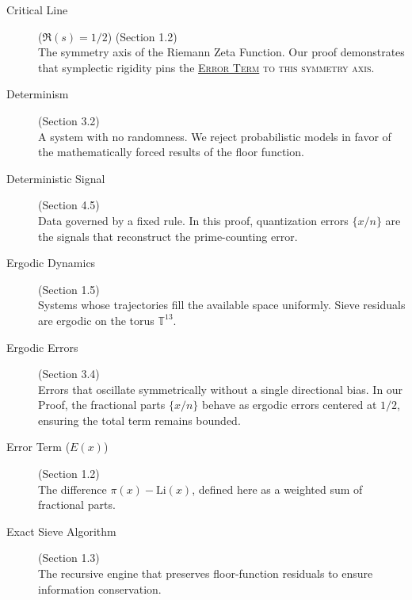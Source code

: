 \documentclass[sn-mathphys-num, pdflatex]{sn-jnl}
\newcommand{\gterm}[2]{\begingroup\normalfont\scshape\hyperlink{#1}{#2}\endgroup}
\begin{document}
\begin{description}
    \item[Critical Line] \hypertarget{critical_line}{}\label{gloss:criticalline} ($\Re(s) = 1/2$) (Section 1.2) \hfill \\
    The symmetry axis of the Riemann Zeta Function. Our proof demonstrates that symplectic rigidity pins the \gterm{error_term}{Error Term} to this symmetry axis.

    \item[Determinism] \hypertarget{deterministic}{}\label{gloss:determinism} (Section 3.2) \hfill \\
    A system with no randomness. We reject probabilistic models in favor of the mathematically forced results of the floor function.

    \item[Deterministic Signal] \hypertarget{deterministic_signal}{}\label{gloss:detsignal} (Section 4.5) \hfill \\
    Data governed by a fixed rule. In this proof, quantization errors $\{x/n\}$ are the signals that reconstruct the prime-counting error.

    \item[Ergodic Dynamics] \hypertarget{ergodic}{}\label{gloss:ergodicdynamics} (Section 1.5) \hfill \\
    Systems whose trajectories fill the available space uniformly. Sieve residuals are ergodic on the torus $\mathbb{T}^{13}$.

    \item[Ergodic Errors] \hypertarget{ergodic_errors}{}\label{gloss:ergodicerrors} (Section 3.4) \hfill \\
    Errors that oscillate symmetrically without a single directional bias. In our Proof, the fractional parts $\{x/n\}$ behave as ergodic errors centered at $1/2$, ensuring the total term remains bounded.

    \item[Error Term \texorpdfstring{($E(x)$)}{(E(x))}] \hypertarget{error_term}{}\label{gloss:errorterm} (Section 1.2) \hfill \\
    The difference $\pi(x) - \text{Li}(x)$, defined here as a weighted sum of fractional parts.

    \item[Exact Sieve Algorithm] \hypertarget{exact_sieve}{}\label{gloss:exactsieve} (Section 1.3) \hfill \\
    The recursive engine that preserves floor-function residuals to ensure information conservation.


\end{description}
\end{document}

